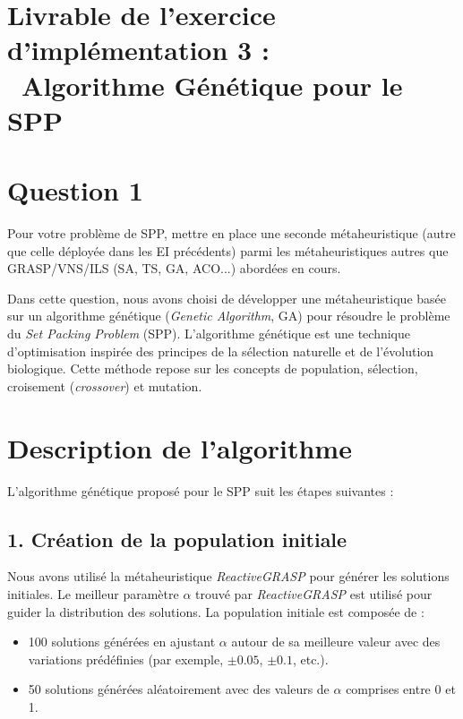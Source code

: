 
\section*{Livrable de l'exercice d'implémentation  3 : \\ Algorithme Génétique pour le SPP}

%
%



\begin{minipage}

\section*{Question 1}
Pour votre problème de SPP, mettre en place une seconde métaheuristique (autre que celle déployée dans les EI précédents) parmi les métaheuristiques autres que GRASP/VNS/ILS (SA, TS, GA, ACO...) abordées en cours.

Dans cette question, nous avons choisi de développer une métaheuristique basée sur un algorithme génétique (\textit{Genetic Algorithm}, GA) pour résoudre le problème du \textit{Set Packing Problem} (SPP). L'algorithme génétique est une technique d'optimisation inspirée des principes de la sélection naturelle et de l'évolution biologique. Cette méthode repose sur les concepts de population, sélection, croisement (\textit{crossover}) et mutation.

\section*{Description de l'algorithme}

L'algorithme génétique proposé pour le SPP suit les étapes suivantes :

\subsection*{1. Création de la population initiale}

Nous avons utilisé la métaheuristique \textit{ReactiveGRASP} pour générer les solutions initiales. Le meilleur paramètre $\alpha$ trouvé par \textit{ReactiveGRASP} est utilisé pour guider la distribution des solutions. La population initiale est composée de :
\begin{itemize}
    \item 100 solutions générées en ajustant $\alpha$ autour de sa meilleure valeur avec des variations prédéfinies (par exemple, $\pm 0.05$, $\pm 0.1$, etc.).
    \item 50 solutions générées aléatoirement avec des valeurs de $\alpha$ comprises entre 0 et 1.
\end{itemize}


\end{minipage}
